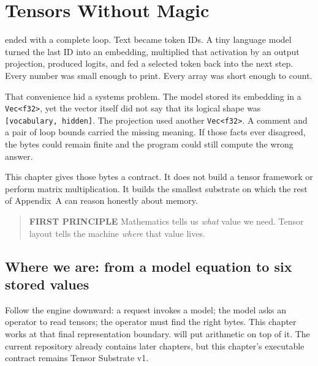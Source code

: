 \chapter{Tensors Without Magic}\label{chapter-5-tensors-without-magic}\label{app:tensors}
 ended with a complete loop. Text became token IDs. A tiny
language model turned the last ID into an embedding, multiplied that
activation by an output projection, produced logits, and fed a selected
token back into the next step. Every number was small enough to print.
Every array was short enough to count.

That convenience hid a systems problem. The model stored its embedding
in a \texttt{Vec\textless{}f32\textgreater{}}, yet the vector itself did
not say that its logical shape was \texttt{{[}vocabulary,\ hidden{]}}.
The projection used another \texttt{Vec\textless{}f32\textgreater{}}. A
comment and a pair of loop bounds carried the missing meaning. If those
facts ever disagreed, the bytes could remain finite and the program
could still compute the wrong answer.

This chapter gives those bytes a contract. It does not build a tensor
framework or perform matrix multiplication. It builds the smallest
substrate on which the rest of Appendix~A can reason honestly about memory.

\begin{quote}
\textbf{FIRST PRINCIPLE} Mathematics tells us \emph{what} value we need.
Tensor layout tells the machine \emph{where} that value lives.
\end{quote}

\section{Where we are: from a model equation to six stored
values}\label{where-we-are-from-a-model-equation-to-six-stored-values}

Follow the engine downward: a request invokes a model; the model asks an
operator to read tensors; the operator must find the right bytes. This
chapter works at that final representation boundary.  will put
arithmetic on top of it. The current repository already contains later
chapters, but this chapter's executable contract remains Tensor
Substrate v1.


